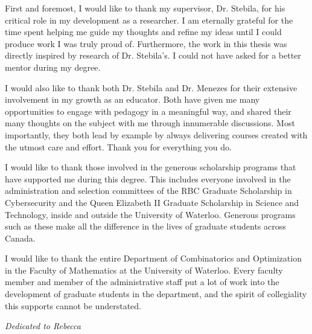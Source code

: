 First and foremost, I would like to thank my supervisor, Dr. Stebila, for his critical role in my development as a researcher. I am eternally grateful for the time spent helping me guide my thoughts and refine my ideas until I could produce work I was truly proud of. Furthermore, the work in this thesis was directly inspired by research of Dr. Stebila's. I could not have asked for a better mentor during my degree.

I would also like to thank both Dr. Stebila and Dr. Menezes for their extensive involvement in my growth as an educator. Both have given me many opportunities to engage with pedagogy in a meaningful way, and shared their many thoughts on the subject with me through innumerable discussions. Most importantly, they both lead by example by always delivering courses created with the utmost care and effort. Thank you for everything you do.

I would like to thank those involved in the generous scholarship programs that have supported me during this degree. This includes everyone involved in the administration and selection committees of the RBC Graduate Scholarship in Cybersecurity and the Queen Elizabeth II Graduate Scholarship in Science and Technology, inside and outside the University of Waterloo. Generous programs such as these make all the difference in the lives of graduate students across Canada.

I would like to thank the entire Department of Combinatorics and Optimization in the Faculty of Mathematics at the University of Waterloo. Every faculty member and member of the administrative staff put a lot of work into the development of graduate students in the department, and the spirit of collegiality this supports cannot be understated.
\cleardoublepage


\vspace*{2.5cm}

\begin{center}\textit{Dedicated to Rebecca}\end{center}
\cleardoublepage

\renewcommand\contentsname{Table of Contents}
\tableofcontents
\cleardoublepage
{}    %

\listoffigures
\cleardoublepage
{}		%

\listoftables
\cleardoublepage
{}		%


